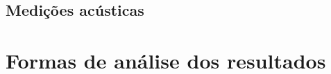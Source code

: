 \documentclass[
		a4paper,	%
		12pt,		%
		]{article}	%
\begin{document}
	\subsection{Medições acústicas} \label{medicoes}
		
	\section{Formas de análise dos resultados} \label{analise}

	{ %
		\printbibliography
	}

	
\end{document}
